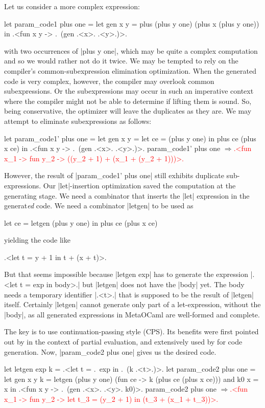 \documentclass[draft]{elsart}
\newcommand{\evalresult}[1]{\ensuremath{\Longrightarrow}\textcolor{red}{#1}}
\begin{document}
Let us consider a more complex expression:
\begin{code}
let param_code1 plus one =
  let gen x y = plus (plus y one) (plus x (plus y one)) in
  .<fun x y -> .~(gen .<x>. .<y>.)>.
\end{code}
with two occurrences of |plus y one|,
which may be quite a complex computation and so we would rather not do
it twice. We may be tempted to rely on the compiler's
common-subexpression elimination optimization. When the generated code is
very complex, however, the compiler may overlook common subexpressions.  Or the
subexpressions may occur in such an imperative context where the compiler
might not be able to determine if lifting them is sound. So, being
conservative, the optimizer will leave the duplicates as they are. 
We may attempt to eliminate subexpressions as follows: 
\begin{code}
let param_code1' plus one =
  let gen x y = let ce = (plus y one) in  plus ce (plus x ce) in
  .<fun x y -> .~(gen .<x>. .<y>.)>.
param_code1' plus one
\evalresult{.<fun x_1 -> fun y_2 -> ((y_2 + 1) + (x_1 + (y_2 + 1)))>.}
\end{code}
However,
the result of |param_code1' plus one| still exhibits duplicate
sub-expressions.  Our |let|-insertion optimization saved the
computation at the generating stage.  We need a combinator that
inserts the |let| expression in the generat\emph{ed} code. We need a
combinator |letgen| to be used as
\begin{code}
let ce = letgen (plus y one) in plus ce (plus x ce)
\end{code}
yielding the code like 
\begin{code}
.<let t = y + 1 in t + (x + t)>.
\end{code}
But that seems impossible because |letgen exp| has to generate
the expression |.<let t = exp in body>.| but |letgen| does not
have the |body| yet. The body needs a temporary identifier |.<t>.|
that is supposed to be the result of |letgen| itself.  Certainly
|letgen| cannot generate only part of a let-expression, without the
|body|, as all generated expressions in MetaOCaml are well-formed and
complete.

The key is to use continuation-passing style (CPS). Its benefits were
first pointed out by \cite{Bondorf:92} in the context of partial
evaluation, and extensively used by \cite{MSP:PADL04,KiselyovTaha} for
code generation. Now, |param_code2 plus one| gives us the desired
code.

\begin{code}
let letgen exp k = .<let t = .~exp in .~(k .<t>.)>.
let param_code2 plus one =
  let gen x y k = letgen (plus y one) (fun ce -> k (plus ce (plus x ce)))
  and k0 x = x
  in .<fun x y -> .~(gen .<x>. .<y>. k0)>.
param_code2 plus one
\evalresult{.<fun x_1 -> fun y_2 -> let t_3 = (y_2 + 1) in (t_3 + (x_1 + t_3))>.}
\end{code}
\end{document}
